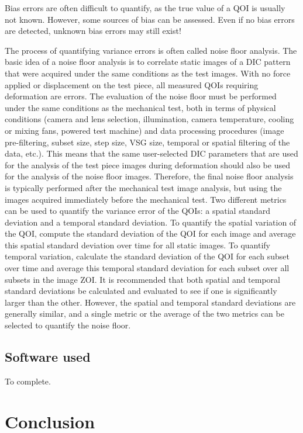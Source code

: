 Bias errors are often difficult to quantify, as the true value of a QOI is usually not known. However, some sources of bias can be assessed. Even if no bias errors are detected, unknown bias errors may still exist!

The process of quantifying variance errors is often called noise floor analysis. The basic idea of a noise floor analysis is to correlate static images of a DIC pattern that were acquired under the same conditions as the test images. With no force applied or displacement on the test piece, all measured QOIs requiring deformation are errors. The evaluation of the noise floor must be performed under the same conditions as the mechanical test, both in terms of physical conditions (camera and lens selection, illumination, camera temperature, cooling or mixing fans, powered test machine) and data processing procedures (image pre-filtering, subset size, step size, VSG size, temporal or spatial filtering of the data, etc.). This means that the same user-selected DIC parameters that are used for the analysis of the test piece images during deformation should also be used for the analysis of the noise floor images. Therefore, the final noise floor analysis is typically performed after the mechanical test image analysis, but using the images acquired immediately before the mechanical test.
Two different metrics can be used to quantify the variance error of the QOIs: a spatial standard deviation and a temporal standard deviation. To quantify the spatial variation of the QOI, compute the standard deviation of the QOI for each image and average this spatial standard deviation over time for all static images. To quantify temporal variation, calculate the standard deviation of the QOI for each subset over time and average this temporal standard deviation for each subset over all subsets in the image ZOI. It is recommended that both spatial and temporal standard deviations be calculated and evaluated to see if one is significantly larger than the other. However, the spatial and temporal standard deviations are generally similar, and a single metric or the average of the two metrics can be selected to quantify the noise floor. 

\subsection{Software used}

To complete.

\section{Conclusion}


